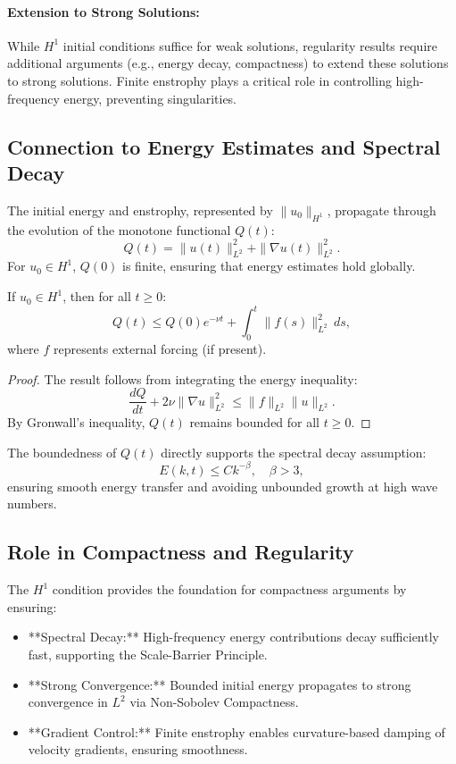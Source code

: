 \paragraph{Extension to Strong Solutions:}
While $H^1$ initial conditions suffice for weak solutions, regularity results require additional arguments (e.g., energy decay, compactness) to extend these solutions to strong solutions. Finite enstrophy plays a critical role in controlling high-frequency energy, preventing singularities.

\subsection{Connection to Energy Estimates and Spectral Decay}
The initial energy and enstrophy, represented by $\|u_0\|_{H^1}$, propagate through the evolution of the monotone functional $Q(t)$:
\begin{equation}
Q(t) = \|u(t)\|_{L^2}^2 + \|\nabla u(t)\|_{L^2}^2.
\end{equation}
For $u_0 \in H^1$, $Q(0)$ is finite, ensuring that energy estimates hold globally.

\begin{lemma}
If $u_0 \in H^1$, then for all $t \geq 0$:
\begin{equation}
Q(t) \leq Q(0) e^{-\nu t} + \int_0^t \|f(s)\|_{L^2}^2 \, ds,
\end{equation}
where $f$ represents external forcing (if present).
\end{lemma}

\begin{proof}
The result follows from integrating the energy inequality:
\begin{equation}
\frac{dQ}{dt} + 2\nu \|\nabla u\|_{L^2}^2 \leq \|f\|_{L^2} \|u\|_{L^2}.
\end{equation}
By Gronwall’s inequality, $Q(t)$ remains bounded for all $t \geq 0$.
\end{proof}

The boundedness of $Q(t)$ directly supports the spectral decay assumption:
\begin{equation}
E(k, t) \leq C k^{-\beta}, \quad \beta > 3,
\end{equation}
ensuring smooth energy transfer and avoiding unbounded growth at high wave numbers.

\subsection{Role in Compactness and Regularity}
The $H^1$ condition provides the foundation for compactness arguments by ensuring:
\begin{itemize}
    \item **Spectral Decay:** High-frequency energy contributions decay sufficiently fast, supporting the Scale-Barrier Principle.
    \item **Strong Convergence:** Bounded initial energy propagates to strong convergence in $L^2$ via Non-Sobolev Compactness.
    \item **Gradient Control:** Finite enstrophy enables curvature-based damping of velocity gradients, ensuring smoothness.
\end{itemize}

